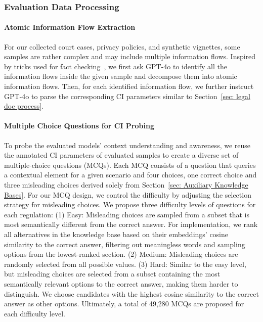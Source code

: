 \subsubsection{Evaluation Data Processing}
\label{sec: data processing}

\paragraph{Atomic Information Flow Extraction} 
For our collected court cases, privacy policies, and synthetic vignettes, some samples are rather complex and may include multiple information flows.
Inspired by tricks used for fact checking~\cite{tang-2024-minicheck, zhang-gao-2023-towards}, we first ask GPT-4o to identify all the information flows inside the given sample and decompose them into atomic information flows.
Then, for each identified information flow, we further instruct GPT-4o to parse the corresponding CI parameters similar to Section~\ref{sec: legal doc process}.






\paragraph{Multiple Choice Questions for CI Probing}

To probe the evaluated models' context understanding and awareness, we reuse the annotated CI parameters of evaluated samples to create a diverse set of multiple-choice questions (MCQs). Each MCQ consists of a question that queries a contextual element for a given scenario and four choices, one correct choice and three misleading choices derived solely from Section~\ref{sec: Auxiliary Knowledge Bases}. For our MCQ design, we control the difficulty by adjusting the selection strategy for misleading choices. We propose three difficulty levels of questions for each regulation: (1) Easy: Misleading choices are sampled from a subset that is most semantically different from the correct answer. For implementation, we rank all alternatives in the knowledge base based on their embeddings' cosine similarity to the correct answer, filtering out meaningless words and sampling options from the lowest-ranked section. (2) Medium: Misleading choices are randomly selected from all possible values. (3) Hard: Similar to the easy level, but misleading choices are selected from a subset containing the most semantically relevant options to the correct answer, making them harder to distinguish. We choose candidates with the highest cosine similarity to the correct answer as other options. Ultimately, a total of 49,280 MCQs are proposed for each difficulty level.


